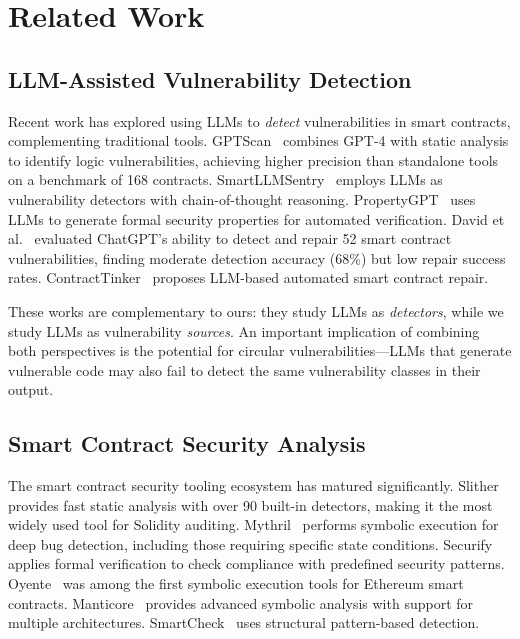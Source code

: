 \section{Related Work}
\label{sec:related}

\subsection{LLM-Assisted Vulnerability Detection}

Recent work has explored using LLMs to \emph{detect} vulnerabilities in smart contracts, complementing traditional tools. GPTScan~\cite{gptscan} combines GPT-4 with static analysis to identify logic vulnerabilities, achieving higher precision than standalone tools on a benchmark of 168 contracts. SmartLLMSentry~\cite{smartllmsentry} employs LLMs as vulnerability detectors with chain-of-thought reasoning. PropertyGPT~\cite{propertygpt} uses LLMs to generate formal security properties for automated verification. David et al.~\cite{david2023you} evaluated ChatGPT's ability to detect and repair 52 smart contract vulnerabilities, finding moderate detection accuracy (68\%) but low repair success rates. ContractTinker~\cite{contracttinker} proposes LLM-based automated smart contract repair.

These works are complementary to ours: they study LLMs as \emph{detectors}, while we study LLMs as vulnerability \emph{sources}. An important implication of combining both perspectives is the potential for circular vulnerabilities---LLMs that generate vulnerable code may also fail to detect the same vulnerability classes in their output.

\subsection{Smart Contract Security Analysis}

The smart contract security tooling ecosystem has matured significantly. Slither~\cite{slither} provides fast static analysis with over 90 built-in detectors, making it the most widely used tool for Solidity auditing. Mythril~\cite{mythril} performs symbolic execution for deep bug detection, including those requiring specific state conditions. Securify~\cite{securify} applies formal verification to check compliance with predefined security patterns. Oyente~\cite{luu2016making} was among the first symbolic execution tools for Ethereum smart contracts. Manticore~\cite{mossberg2019manticore} provides advanced symbolic analysis with support for multiple architectures. SmartCheck~\cite{smartcheck} uses structural pattern-based detection.

